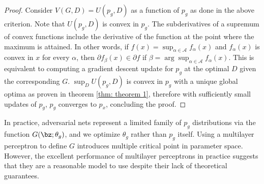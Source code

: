 \begin{proof}
	Consider $V(G,D)=U(p_g,D)$ as a function of $p_g$ as done in the above criterion. Note that $U(p_g,D)$ is convex in $p_g$. The subderivatives of a supremum of  convex functions include the derivative of the function at the point where the maximum is attained. In other words, if $f(x)=\sup_{\alpha\in\mathcal{A}}f_{\alpha}(x)$ and $f_{\alpha}(x)$ is convex in $x$ for every $\alpha$, then $\partial f_{\beta}(x)\in\partial f$ if $\beta=\arg\sup_{\alpha\in\mathcal{A}}f_{\alpha}(x)$. This is equivalent to computing a gradient descent update for $p_g$ at the optimal $D$ given the corresponding $G$. $\sup_DU(p_g, D)$ is convex in $p_g$ with a unique global optima as proven in theorem \ref{thm: theorem 1}, therefore with sufficiently small updates of $p_g$, $p_g$ converges to $p_x$, concluding the proof.
\end{proof}

In practice, adversarial nets represent a limited family of $p_g$ distributions via the function $G(\bz; \theta_g)$, and we optimize $\theta_g$ rather than $p_g$ itself. Using a multilayer perceptron to define $G$ introduces multiple critical point in parameter space. However, the excellent performance of multilayer perceptrons in practice suggests that they are a reasonable model to use despite their lack of theoretical guarantees.
